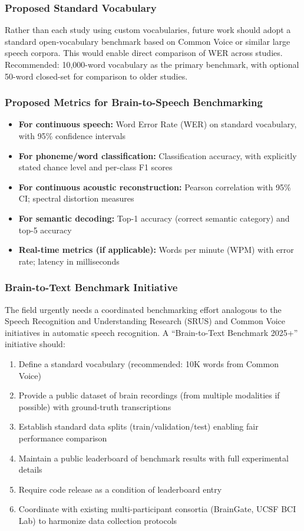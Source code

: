 \subsubsection{Proposed Standard Vocabulary}

Rather than each study using custom vocabularies, future work should adopt a standard open-vocabulary benchmark based on Common Voice or similar large speech corpora. This would enable direct comparison of WER across studies. Recommended: 10,000-word vocabulary as the primary benchmark, with optional 50-word closed-set for comparison to older studies.

\subsubsection{Proposed Metrics for Brain-to-Speech Benchmarking}

\begin{itemize}
    \item \textbf{For continuous speech:} Word Error Rate (WER) on standard vocabulary, with 95\% confidence intervals
    \item \textbf{For phoneme/word classification:} Classification accuracy, with explicitly stated chance level and per-class F1 scores
    \item \textbf{For continuous acoustic reconstruction:} Pearson correlation with 95\% CI; spectral distortion measures
    \item \textbf{For semantic decoding:} Top-1 accuracy (correct semantic category) and top-5 accuracy
    \item \textbf{Real-time metrics (if applicable):} Words per minute (WPM) with error rate; latency in milliseconds
\end{itemize}

\subsubsection{Brain-to-Text Benchmark Initiative}

The field urgently needs a coordinated benchmarking effort analogous to the Speech Recognition and Understanding Research (SRUS) and Common Voice initiatives in automatic speech recognition. A ``Brain-to-Text Benchmark 2025+'' initiative should:

\begin{enumerate}
    \item Define a standard vocabulary (recommended: 10K words from Common Voice)
    \item Provide a public dataset of brain recordings (from multiple modalities if possible) with ground-truth transcriptions
    \item Establish standard data splits (train/validation/test) enabling fair performance comparison
    \item Maintain a public leaderboard of benchmark results with full experimental details
    \item Require code release as a condition of leaderboard entry
    \item Coordinate with existing multi-participant consortia (BrainGate, UCSF BCI Lab) to harmonize data collection protocols
\end{enumerate}

